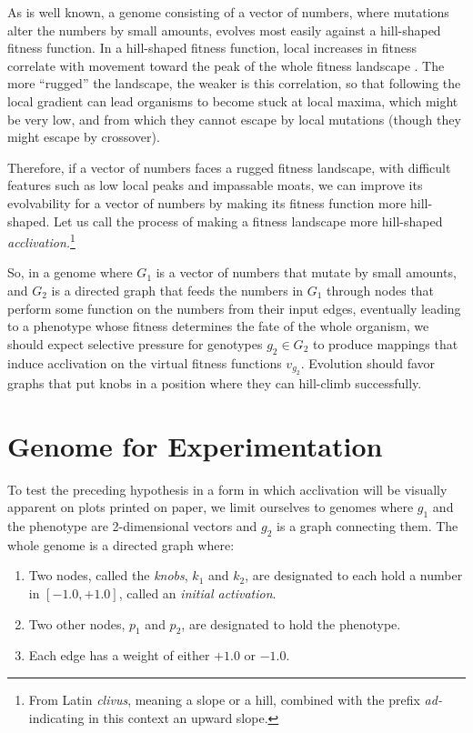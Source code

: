 \documentclass[letterpaper]{article}
\begin{document}
As is well known, a genome consisting of a vector of numbers, where mutations
alter the numbers by small amounts, evolves most easily against a hill-shaped
fitness function. In a hill-shaped fitness function, local increases in
fitness correlate with movement toward the peak of the whole fitness
landscape \citep{kauffman1987towards}. The more ``rugged'' the landscape, the
weaker is this correlation, so that following the local gradient can lead
organisms to become stuck at local maxima, which might be very low, and from
which they cannot escape by local mutations (though they might escape by
crossover).

Therefore, if a vector of numbers faces a rugged fitness landscape, with
difficult features such as low local peaks and impassable moats, we can
improve its evolvability for a vector of numbers by making its fitness
function more hill-shaped. Let us call the process of making a fitness
landscape more hill-shaped \textit{acclivation.}\footnote{From
Latin \textit{clivus}, meaning a
slope or a hill, combined with the prefix \textit{ad-} indicating in this
context an upward slope.}

So, in a genome where $G_1$ is a vector of numbers that mutate by small
amounts, and $G_2$ is a directed graph that feeds the numbers in $G_1$ through
nodes that perform some function on the numbers from their input edges,
eventually leading to a phenotype whose fitness determines the fate of the
whole organism, we should expect selective pressure for genotypes $g_2 \in
G_2$ to produce mappings that induce acclivation on the virtual fitness
functions $v_{g_2}$. Evolution should favor graphs that put knobs in a
position where they can hill-climb successfully.

\section{Genome for Experimentation}

To test the preceding hypothesis in a form in which acclivation will be
visually apparent on plots printed on paper, we limit ourselves to genomes
where $g_1$ and the phenotype are 2-dimensional vectors and $g_2$ is a graph
connecting them.  The whole genome is a directed graph where:
\begin{enumerate}
   \item Two nodes, called the \textit{knobs}, $k_1$ and $k_2$, are designated
      to each hold a number in $[-1.0, +1.0]$, called an \textit{initial
      activation}.
   \item Two other nodes, $p_1$ and $p_2$, are designated to hold the
      phenotype.
   \item Each edge has a weight of either $+1.0$ or $-1.0$.
\end{enumerate}
\end{document}

